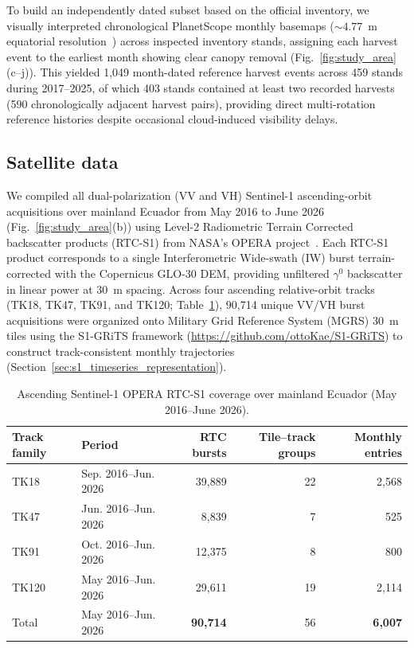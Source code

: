 To build an independently dated subset based on the official inventory, we visually interpreted chronological PlanetScope monthly basemaps (${\sim}4.77$~m equatorial resolution~\citep{Planet2024Basemaps}) across inspected inventory stands, assigning each harvest event to the earliest month showing clear canopy removal (Fig.~\ref{fig:study_area}(c--j)). This yielded 1,049 month-dated reference harvest events across 459 stands during 2017--2025, of which 403 stands contained at least two recorded harvests (590 chronologically adjacent harvest pairs), providing direct multi-rotation reference histories despite occasional cloud-induced visibility delays.


\subsection{Satellite data}
\label{sec:satellitedata}

We compiled all dual-polarization (VV and VH) Sentinel-1 ascending-orbit acquisitions over mainland Ecuador from May 2016 to June 2026 (Fig.~\ref{fig:study_area}(b)) using Level-2 Radiometric Terrain Corrected backscatter products (RTC-S1) from NASA's OPERA project~\citep{opera2023rtc}. Each RTC-S1 product corresponds to a single Interferometric Wide-swath (IW) burst terrain-corrected with the Copernicus GLO-30 DEM, providing unfiltered $\gamma^{0}$ backscatter in linear power at 30~m spacing. Across four ascending relative-orbit tracks (TK18, TK47, TK91, and TK120; Table~\ref{tab:s1_observation_coverage}), 90,714 unique VV/VH burst acquisitions were organized onto Military Grid Reference System (MGRS) 30~m tiles using the S1-GRiTS framework (\url{https://github.com/ottoKae/S1-GRiTS}) to construct track-consistent monthly trajectories (Section~\ref{sec:s1_timeseries_representation}).

\begin{table}[pos=!htbp]
    \centering
    \small
    \setlength{\tabcolsep}{4pt}
    \caption{Ascending Sentinel-1 OPERA RTC-S1 coverage over mainland Ecuador (May 2016--June 2026).
    }
    \label{tab:s1_observation_coverage}
    \begin{tabular*}{\linewidth}{@{\extracolsep{\fill}}llrrr@{}}
        \toprule
        Track family & Period & RTC bursts & Tile--track groups & Monthly entries \\
        \midrule
        TK18  & Sep. 2016--Jun. 2026 & 39,889 & 22 & 2,568 \\
        TK47  & Jun. 2016--Jun. 2026 & 8,839  & 7  & 525   \\
        TK91  & Oct. 2016--Jun. 2026 & 12,375 & 8  & 800   \\
        TK120 & May 2016--Jun. 2026 & 29,611 & 19 & 2,114 \\
        \midrule
        Total & May 2016--Jun. 2026 & \textbf{90,714} & 56 & \textbf{6,007} \\
        \bottomrule
    \end{tabular*}
\end{table}
